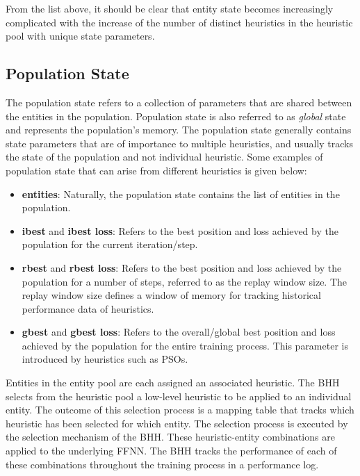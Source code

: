 From the list above, it should be clear that entity state becomes increasingly complicated with the increase of the number of distinct heuristics in the heuristic pool with unique state parameters.

\subsection{Population State}\label{sec:bhh:entity_pool:population_state}

The population state refers to a collection of parameters that are shared between the entities in the population. Population state is also referred to as \textit{global} state and represents the population's memory. The population state generally contains state parameters that are of importance to multiple heuristics, and usually tracks the state of the population and not individual heuristic. Some examples of population state that can arise from different heuristics is given below:

\begin{itemize}
      \item \textbf{entities}: Naturally, the population state contains the list of entities in the population.

      \item \textbf{ibest} and \textbf{ibest loss}: Refers to the best position and loss achieved by the population for the current iteration/step.

      \item \textbf{rbest} and \textbf{rbest loss}: Refers to the best position and loss achieved by the population for a number of steps, referred to as the replay window size. The replay window size defines a window of memory for tracking historical performance data of heuristics.

      \item \textbf{gbest} and \textbf{gbest loss}: Refers to the overall/global best position and loss achieved by the population for the entire training process. This parameter is introduced by heuristics such as \acp{PSO}.
\end{itemize}

Entities in the entity pool are each assigned an associated heuristic. The \acs{BHH} selects from the heuristic pool a low-level heuristic to be applied to an individual entity. The outcome of this selection process is a mapping table that tracks which heuristic has been selected for which entity. The selection process is executed by the selection mechanism of the \acs{BHH}. These heuristic-entity combinations are applied to the underlying \acs{FFNN}. The \acs{BHH} tracks the performance of each of these combinations throughout the training process in a performance log.


